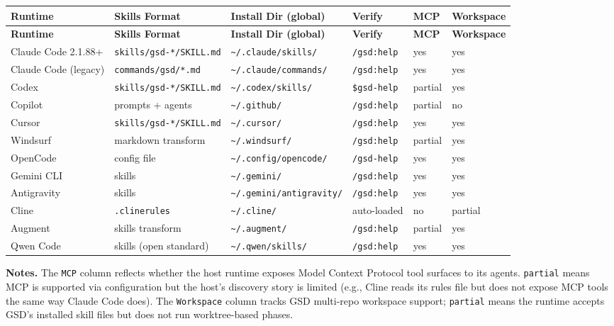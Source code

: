\documentclass[11pt,letterpaper,openany]{book}
\begin{document}
\begin{small}
\begin{longtable}{@{}p{2.4cm}p{2.4cm}p{3.6cm}p{1.8cm}p{1.4cm}p{1.4cm}@{}}
\toprule
\textbf{Runtime} & \textbf{Skills Format} & \textbf{Install Dir (global)} &
\textbf{Verify} & \textbf{MCP} & \textbf{Workspace} \\
\midrule
\endfirsthead
\toprule
\textbf{Runtime} & \textbf{Skills Format} & \textbf{Install Dir (global)} &
\textbf{Verify} & \textbf{MCP} & \textbf{Workspace} \\
\midrule
\endhead
Claude Code 2.1.88+ & \texttt{skills/gsd-*/SKILL.md} &
\texttt{\textasciitilde/.claude/skills/} & \texttt{/gsd:help} & yes & yes \\
Claude Code (legacy) & \texttt{commands/gsd/*.md} &
\texttt{\textasciitilde/.claude/commands/} & \texttt{/gsd:help} & yes & yes \\
Codex & \texttt{skills/gsd-*/SKILL.md} &
\texttt{\textasciitilde/.codex/skills/} & \texttt{\$gsd-help} & partial & yes \\
Copilot & prompts + agents &
\texttt{\textasciitilde/.github/} & \texttt{/gsd:help} & partial & no \\
Cursor & \texttt{skills/gsd-*/SKILL.md} &
\texttt{\textasciitilde/.cursor/} & \texttt{/gsd:help} & yes & yes \\
Windsurf & markdown transform &
\texttt{\textasciitilde/.windsurf/} & \texttt{/gsd:help} & partial & yes \\
OpenCode & config file &
\texttt{\textasciitilde/.config/opencode/} & \texttt{/gsd-help} & yes & yes \\
Gemini CLI & skills &
\texttt{\textasciitilde/.gemini/} & \texttt{/gsd:help} & yes & yes \\
Antigravity & skills &
\texttt{\textasciitilde/.gemini/antigravity/} & \texttt{/gsd:help} & yes & yes \\
Cline & \texttt{.clinerules} &
\texttt{\textasciitilde/.cline/} & auto-loaded & no & partial \\
Augment & skills transform &
\texttt{\textasciitilde/.augment/} & \texttt{/gsd:help} & partial & yes \\
Qwen Code & skills (open standard) &
\texttt{\textasciitilde/.qwen/skills/} & \texttt{/gsd:help} & yes & yes \\
\bottomrule
\end{longtable}
\end{small}

\textbf{Notes.} The \texttt{MCP} column reflects whether the host runtime
exposes Model Context Protocol tool surfaces to its agents. \texttt{partial}
means MCP is supported via configuration but the host's discovery story is
limited (e.g., Cline reads its rules file but does not expose MCP tools the
same way Claude Code does). The \texttt{Workspace} column tracks GSD
multi-repo workspace support; \texttt{partial} means the runtime accepts
GSD's installed skill files but does not run worktree-based phases.
\end{document}

